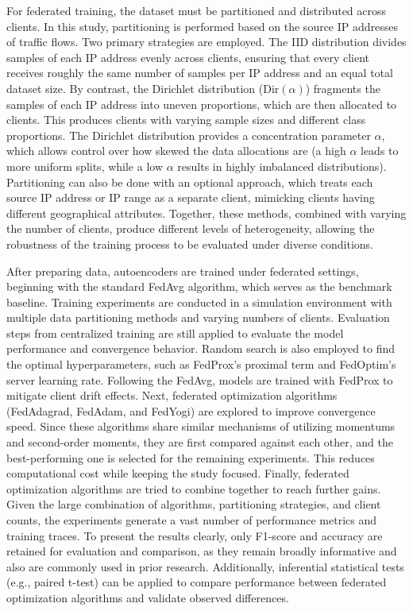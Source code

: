 For federated training, the dataset must be partitioned and distributed across clients. In this study, partitioning is performed based on the source IP addresses of traffic flows. Two primary strategies are employed. The IID distribution divides samples of each IP address evenly across clients, ensuring that every client receives roughly the same number of samples per IP address and an equal total dataset size. By contrast, the Dirichlet distribution ($\text{Dir}(\alpha)$) fragments the samples of each IP address into uneven proportions, which are then allocated to clients. This produces clients with varying sample sizes and different class proportions. The Dirichlet distribution provides a concentration parameter $\alpha$, which allows control over how skewed the data allocations are (a high $\alpha$ leads to more uniform splits, while a low $\alpha$ results in highly imbalanced distributions). Partitioning can also be done with an optional approach, which treats each source IP address or IP range as a separate client, mimicking clients having different geographical attributes. Together, these methods, combined with varying the number of clients, produce different levels of heterogeneity, allowing the robustness of the training process to be evaluated under diverse conditions.

After preparing data, autoencoders are trained under federated settings, beginning with the standard FedAvg algorithm, which serves as the benchmark baseline. Training experiments are conducted in a simulation environment with multiple data partitioning methods and varying numbers of clients. Evaluation steps from centralized training are still applied to evaluate the model performance and convergence behavior. Random search is also employed to find the optimal hyperparameters, such as FedProx's proximal term and FedOptim's server learning rate. Following the FedAvg, models are trained with FedProx to mitigate client drift effects. Next, federated optimization algorithms (FedAdagrad, FedAdam, and FedYogi) are explored to improve convergence speed. Since these algorithms share similar mechanisms of utilizing momentums and second-order moments, they are first compared against each other, and the best-performing one is selected for the remaining experiments. This reduces computational cost while keeping the study focused. Finally, federated optimization algorithms are tried to combine together to reach further gains. Given the large combination of algorithms, partitioning strategies, and client counts, the experiments generate a vast number of performance metrics and training traces. To present the results clearly, only F1-score and accuracy are retained for evaluation and comparison, as they remain broadly informative and also are commonly used in prior research. Additionally, inferential statistical tests (e.g., paired t-test) can be applied to compare performance between federated optimization algorithms and validate observed differences.

